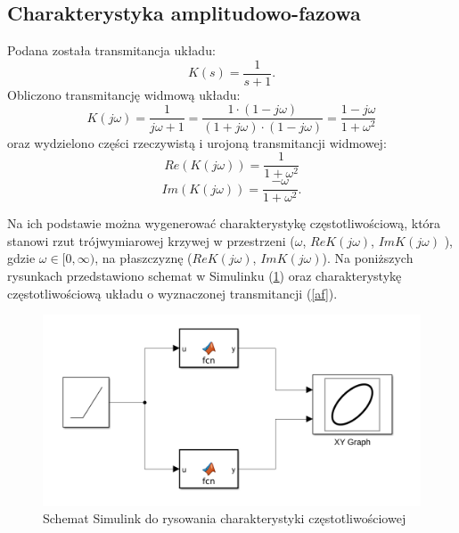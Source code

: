 \documentclass[12pt]{article}
\begin{document}
\subsection{Charakterystyka amplitudowo-fazowa}
Podana została transmitancja układu:
\begin{equation}
    K(s) = \frac{1}{s+1}.
    \label{af}
\end{equation}
Obliczono transmitancję widmową układu:
\begin{equation}
    K(j\omega) = \frac{1}{j\omega + 1} = \frac{1\cdot (1-j\omega)}{(1+j\omega)\cdot (1-j\omega)} = \frac{1-j\omega}{1+\omega^2} 
\end{equation}
oraz wydzielono części rzeczywistą i urojoną transmitancji widmowej:
\begin{equation}
    Re(K(j\omega)) = \frac{1}{1+\omega^2}
\end{equation}
\begin{equation}
    Im(K(j\omega)) = \frac{-\omega}{1+\omega^2}.
\end{equation}

Na ich podstawie można wygenerować charakterystykę częstotliwościową, która stanowi rzut trójwymiarowej krzywej w przestrzeni ($\omega$, $ReK(j\omega)$, $ImK(j\omega)$ ), gdzie $\omega \in  [0, \infty)$, na płaszczyznę ($ReK(j\omega)$, $ImK(j\omega)$). Na poniższych rysunkach przedstawiono schemat w Simulinku (\ref{sim_af}) oraz charakterystykę częstotliwościową układu o wyznaczonej transmitancji (\ref{af}).

\begin{figure}[H]
    \centering
    \includegraphics[scale=0.25]{sim_af.png}
    \caption{Schemat Simulink do rysowania charakterystyki częstotliwościowej}
    \label{sim_af}
\end{figure}
\end{document}
